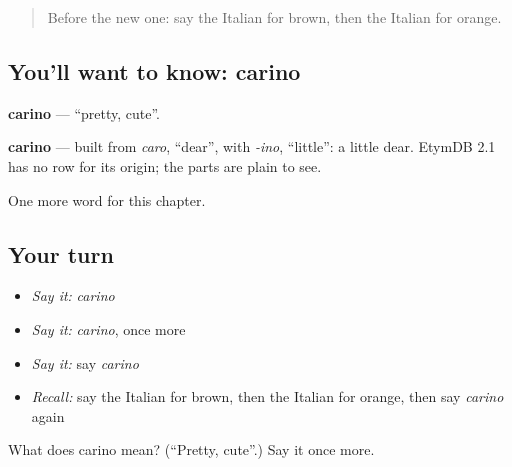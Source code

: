 \begin{quote}
Before the new one: say the Italian for brown, then the Italian for orange.
\end{quote}

\subsection*{You'll want to know: carino}
\textbf{carino} — \textquotedblleft{}pretty, cute\textquotedblright{}.

\begin{cousinweb}
\textbf{carino} — built from \emph{caro}, \textquotedblleft{}dear\textquotedblright{}, with \emph{-ino}, \textquotedblleft{}little\textquotedblright{}: a little dear. EtymDB 2.1 has no row for its origin; the parts are plain to see.
\end{cousinweb}

\begin{grammarlens}[title={What you've built}]
One more word for this chapter.
\end{grammarlens}

\subsection*{Your turn}
\begin{itemize}
\raggedright
  \item \emph{Say it:} \emph{carino}
  \item \emph{Say it:} \emph{carino}, once more
  \item \emph{Say it:} say \emph{carino}
  \item \emph{Recall:} say the Italian for brown, then the Italian for orange, then say \emph{carino} again
\end{itemize}

\begin{tcolorbox}[breakable,colback=teal!4,colframe=teal!35!black,title={Before you move on}]
What does carino mean? (\textquotedblleft{}Pretty, cute\textquotedblright{}.) Say it once more.
\end{tcolorbox}
